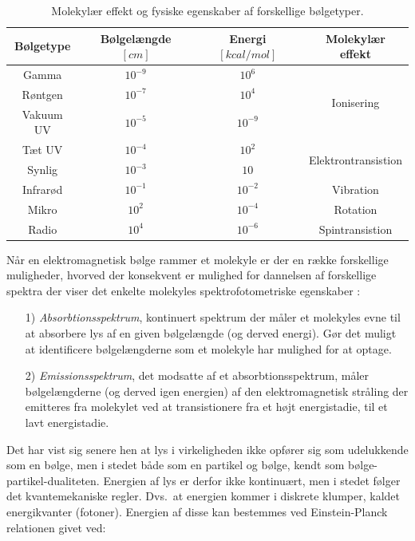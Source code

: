     \begin{table}[H]\centering
        \caption{Molekylær effekt og fysiske egenskaber af forskellige bølgetyper.}
        \begin{tabular}{cccc}
            \toprule
            Bølgetype & Bølgelængde $\left[\si{cm}\right]$ & Energi $\left[\si{kcal\per mol}\right]$ & Molekylær effekt \\
            \midrule
            Gamma & $10^{-9}$ & $10^6$ & \multirow{3}{*}{Ionisering} \\
            Røntgen & $10^{-7}$ & $10^4$ \\
            Vakuum UV & $10^{-5}$ & $10^{-9}$ \\
            \midrule
            Tæt UV & $10^{-4}$ & $10^2$ & \multirow{2}{*}{Elektrontransistion} \\
            Synlig & $10^{-3}$ & $10$ \\
            \midrule
            Infrarød & $10^{-1}$ & $10^{-2}$ & Vibration \\
            Mikro & $10^2$ & $10^{-4}$ & Rotation \\
            Radio & $10^4$ & $10^{-6}$ & Spintransistion \\
            \bottomrule
        \end{tabular}
    \end{table}
    Når en elektromagnetisk bølge rammer et molekyle er der en række forskellige muligheder, hvorved der konsekvent er mulighed for dannelsen af forskellige spektra der viser det enkelte molekyles spektrofotometriske egenskaber \parencite{Finn2020}:
    \begin{itemize}
        \item[1)] \textit{Absorbtionsspektrum}, kontinuert spektrum der måler et molekyles evne til at absorbere lys af en given bølgelængde (og derved energi). Gør det muligt at identificere bølgelængderne som et molekyle har mulighed for at optage.
        \item[2)] \textit{Emissionsspektrum}, det modsatte af et absorbtionsspektrum, måler bølgelængderne (og derved igen energien) af den elektromagnetisk stråling der emitteres fra molekylet ved at transistionere fra et højt energistadie, til et lavt energistadie.
    \end{itemize}
    Det har vist sig senere hen at lys i virkeligheden ikke opfører sig som udelukkende som en bølge, men i stedet både som en partikel og bølge, kendt som bølge-partikel-dualiteten. Energien af lys er derfor ikke kontinuært, men i stedet følger det kvantemekaniske regler. Dvs.\ at energien kommer i diskrete klumper, kaldet energikvanter (fotoner). Energien af disse kan bestemmes ved Einstein-Planck relationen givet ved:
